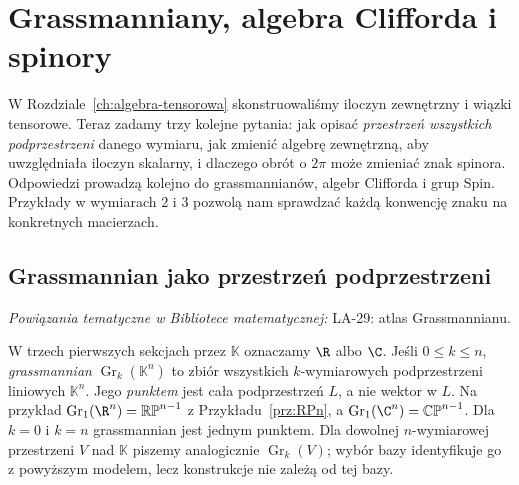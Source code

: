 \chapter{Grassmanniany, algebra Clifforda i spinory}
\label{ch:grass-spin}

\providecommand{\atlasref}[2]{#2}


W Rozdziale~\ref{ch:algebra-tensorowa} skonstruowaliśmy iloczyn
zewnętrzny i wiązki tensorowe. Teraz zadamy trzy kolejne pytania:
jak opisać \emph{przestrzeń wszystkich podprzestrzeni} danego wymiaru,
jak zmienić algebrę zewnętrzną, aby uwzględniała iloczyn skalarny,
i dlaczego obrót o $2\pi$ może zmieniać znak spinora.
Odpowiedzi prowadzą kolejno do grassmannianów, algebr Clifforda
i grup Spin. Przykłady w wymiarach $2$ i $3$ pozwolą nam
sprawdzać każdą konwencję znaku na konkretnych macierzach.

\section{Grassmannian jako przestrzeń podprzestrzeni}
\label{sec:grass-atlas}

\noindent\emph{Powiązania tematyczne w Bibliotece matematycznej:} \atlasref{LA-29::thm:lin29-grass-atlas}{LA-29: atlas Grassmannianu}.


W trzech pierwszych sekcjach przez $\mathbb K$ oznaczamy
$\R$ albo $\C$.
Jeśli $0\leq k\leq n$, \emph{grassmannian}
$\operatorname{Gr}_k(\mathbb K^n)$ to zbiór wszystkich
$k$-wymiarowych podprzestrzeni liniowych $\mathbb K^n$.
Jego \emph{punktem} jest cała podprzestrzeń $L$,
a nie wektor w $L$. Na przykład
$\operatorname{Gr}_1(\R^n)=\mathbb{RP}^{n-1}$
z Przykładu~\ref{prz:RPn}, a
$\operatorname{Gr}_1(\C^n)=\mathbb{CP}^{n-1}$.
Dla $k=0$ i $k=n$ grassmannian jest jednym punktem.
Dla dowolnej $n$-wymiarowej przestrzeni $V$ nad $\mathbb K$
piszemy analogicznie $\operatorname{Gr}_k(V)$; wybór bazy
identyfikuje go z powyższym modelem, lecz konstrukcje nie zależą od tej bazy.

